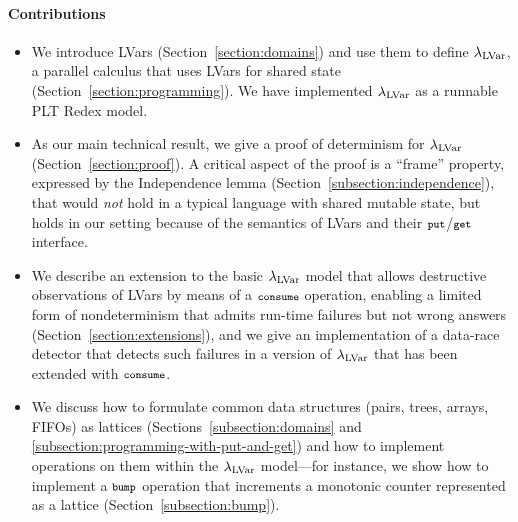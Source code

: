 \paragraph{Contributions} 
\begin{itemize}
\item We introduce LVars 
  (Section~\ref{section:domains}) and use them to define
  $\textup{\ensuremath{\lambda_{\textrm{LVar}}}}$, a parallel calculus 
  that uses LVars for shared state 
  (Section~\ref{section:programming}).
  We have implemented $\textup{\ensuremath{\lambda_{\textrm{LVar}}}}$ as a runnable PLT
  Redex model.


\item As our main technical result, we give a proof of determinism
  for $\textup{\ensuremath{\lambda_{\textrm{LVar}}}}$ (Section~\ref{section:proof}).  A critical aspect
  of the proof is a ``frame'' property, expressed by the
  Independence lemma (Section~\ref{subsection:independence}),
  that would {\em not} hold in a typical language with shared mutable
  state, but holds in our setting because of the semantics of LVars
  and their $\mbox{\footnotesize \texttt{put}}$/$\mbox{\footnotesize \texttt{get}}$ interface.


\item We describe an extension to the basic $\textup{\ensuremath{\lambda_{\textrm{LVar}}}}$ model
  that allows
  destructive observations of LVars by means of a $\mbox{\footnotesize \texttt{consume}}$
  operation, enabling a limited form of nondeterminism that admits
  run-time failures but not wrong answers (Section~\ref{section:extensions}),
  and we give an implementation of a data-race detector that detects 
  such failures in a version of $\textup{\ensuremath{\lambda_{\textrm{LVar}}}}$ that has been extended with $\mbox{\footnotesize \texttt{consume}}$.

\item
  We discuss how to
  formulate common data structures (pairs, trees, arrays, FIFOs) as
  lattices (Sections~\ref{subsection:domains} and
  \ref{subsection:programming-with-put-and-get})
  and how to implement operations on them within the $\textup{\ensuremath{\lambda_{\textrm{LVar}}}}$ model---for instance,
  we show how to implement a $\mbox{\footnotesize \texttt{bump}}$ operation that increments a
  monotonic counter represented as a lattice
  (Section~\ref{subsection:bump}).


\end{itemize}
